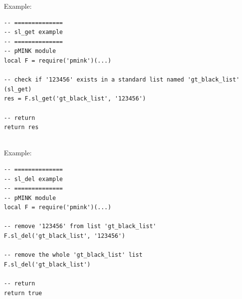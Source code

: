\documentclass[a4paper,latin]{paper}
\begin{document}
\noindent{}Example:
\begin{lstlisting}[style=LuaInputStyle, belowskip=4\baselineskip, upquote=true]
-- ==============
-- sl_get example 
-- ==============
-- pMINK module
local F = require('pmink')(...)

-- check if '123456' exists in a standard list named 'gt_black_list' (sl_get)
res = F.sl_get('gt_black_list', '123456')

-- return
return res
\end{lstlisting}

\\

\noindent{}Example:
\begin{lstlisting}[style=LuaInputStyle, belowskip=4\baselineskip, upquote=true]
-- ==============
-- sl_del example 
-- ==============
-- pMINK module
local F = require('pmink')(...)

-- remove '123456' from list 'gt_black_list'
F.sl_del('gt_black_list', '123456')

-- remove the whole 'gt_black_list' list
F.sl_del('gt_black_list')

-- return
return true
\end{lstlisting}
\end{document}
